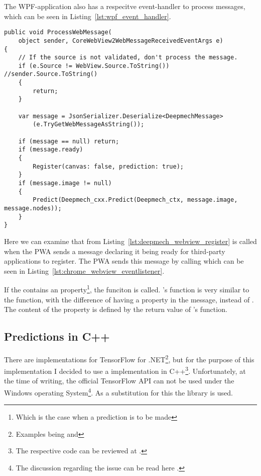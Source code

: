 The WPF-application also has a respecitve event-handler to process messages, which can be seen in Listing~\ref{lst:wpf_event_handler}.

\begin{lstlisting}[label={lst:wpf_event_handler}, caption={Event handler of the WPF-application}]
public void ProcessWebMessage(
    object sender, CoreWebView2WebMessageReceivedEventArgs e)
{
    // If the source is not validated, don't process the message.
    if (e.Source != WebView.Source.ToString()) //sender.Source.ToString()
    {
        return;
    }

    var message = JsonSerializer.Deserialize<DeepmechMessage>
        (e.TryGetWebMessageAsString());

    if (message == null) return;
    if (message.ready)
    {
        Register(canvas: false, prediction: true);
    }
    if (message.image != null)
    {
        Predict(Deepmech_cxx.Predict(Deepmech_ctx, message.image, message.nodes));
    }
}
\end{lstlisting}

Here we can examine that  from Listing~\ref{lst:deepmech_webview_register} is called when the PWA sends a message declaring it being ready for third-party applications to register.
The PWA sends this message by calling  which can be seen in Listing~\ref{lst:chrome_webview_eventlistener}.

If the  contains an  property\footnote{Which is the case when a prediction is to be made}, the  funciton is called.
's  function is very similar to the  function, with the difference of having a  property in the message, instead of .
The content of the  property is defined by the return value of 's  function.

\subsection{Predictions in C++}

There are implementations for TensorFlow for .NET\footnote{Examples being  and  },
but for the purpose of this implementation I decided to use a implementation in C++\footnote{The respective code can be reviewed at .}.
Unfortunately, at the time of writing, the official TensorFlow API can not be used under the Windows operating System\footnote{The discussion regarding the issue can be read here .}.
As a substitution for this the  library is used. %

